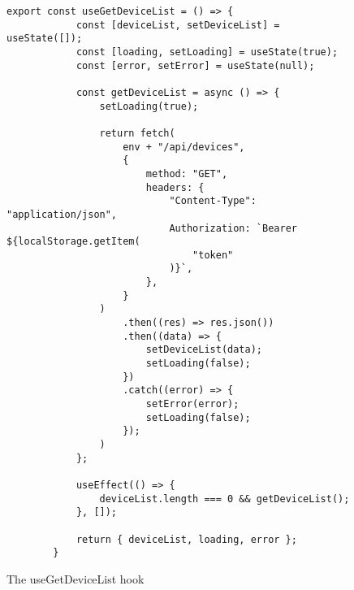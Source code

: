 \begin{figure}[htbp]
    \begin{lstlisting}[language=React]
        export const useGetDeviceList = () => {
            const [deviceList, setDeviceList] = useState([]);
            const [loading, setLoading] = useState(true);
            const [error, setError] = useState(null);

            const getDeviceList = async () => {
                setLoading(true);

                return fetch(
                    env + "/api/devices",
                    {
                        method: "GET",
                        headers: {
                            "Content-Type": "application/json",
                            Authorization: `Bearer ${localStorage.getItem(
                                "token"
                            )}`,
                        },
                    }
                )
                    .then((res) => res.json())
                    .then((data) => {
                        setDeviceList(data);
                        setLoading(false);
                    })
                    .catch((error) => {
                        setError(error);
                        setLoading(false);
                    });
                )
            };

            useEffect(() => {
                deviceList.length === 0 && getDeviceList();
            }, []);

            return { deviceList, loading, error };
        }
    \end{lstlisting}
    \caption{The useGetDeviceList hook}
    \label{fig:useGetDeviceList}
\end{figure}
